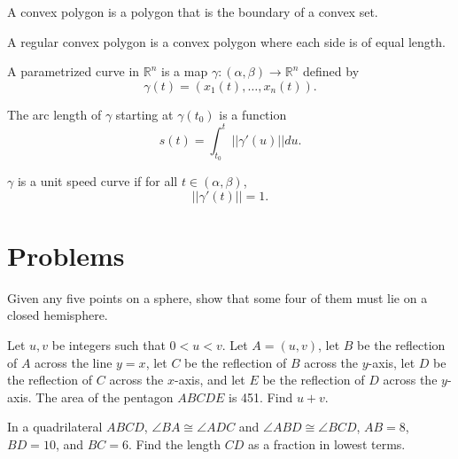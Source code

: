 \documentclass{article}
\begin{document}
\begin{definition}
A convex polygon is a polygon that is the boundary of a convex set.
\end{definition}

\begin{definition}
A regular convex polygon is a convex polygon where each side is of equal length. 
\end{definition}

\begin{definition}
A parametrized curve in $\mathbb{R}^{n}$ is a map $\gamma: (\alpha, \beta) \rightarrow \mathbb{R}^{n}$ defined by 
\[\gamma(t) = (x_{1}(t), \ldots, x_{n}(t)).\]  
\end{definition}

\begin{definition}
The arc length of $\gamma$ starting at $\gamma(t_{0})$ is a function 
\[
s(t) = \int_{t_{0}}^{t} ||\gamma'(u)|| du.
\]
\end{definition}

\begin{definition}
$\gamma$ is a unit speed curve if for all $t \in (\alpha, \beta)$, 
\[
||\gamma'(t)|| = 1. 
\]
\end{definition}

\section{Problems}

\begin{exercise}[2002 A2]
Given any five points on a sphere, show that some four of them must lie on a closed hemisphere.
\end{exercise}

\begin{exercise}
Let \(u,v\) be integers such that \(0<u<v\). Let \(A=(u,v)\), let \(B\) be the reflection of \(A\) across the line \(y=x\), let \(C\) be the reflection of \(B\) across the \(y\)-axis, let \(D\) be the reflection of \(C\) across the \(x\)-axis, and let \(E\) be the reflection of \(D\) across the \(y\)-axis. The area of the pentagon \(ABCDE\) is 451. Find \(u+v\).
\end{exercise}

\begin{exercise}
In a quadrilateral \(ABCD\), \(\angle BA\cong\angle ADC\) and \(\angle ABD\cong\angle BCD\), \(AB=8\), \(BD=10\), and \(BC=6\). Find the length \(CD\) as a fraction in lowest terms.
\end{exercise}
\end{document}

